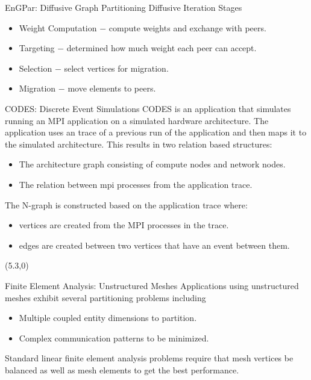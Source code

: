 \documentclass{beamer}
\begin{document}
\begin{textblock}{15.6}
\begin{textblock}{5}
\begin{block}{EnGPar: Diffusive Graph Partitioning}
      Diffusive Iteration Stages
      \begin{itemize}
      \item Weight Computation $-$ compute weights and exchange with peers.
      \item Targeting $-$ determined how much weight each peer can accept.
      \item Selection $-$ select vertices for migration.
      \item Migration $-$ move elements to peers.
      \end{itemize}
    \end{block}
    \begin{block}{CODES: Discrete Event Simulations}
      CODES is an application that simulates running an MPI application on a simulated hardware architecture. The application uses an trace of a previous run of the application and then maps it to the simulated architecture. This results in two relation based structures:
      \begin{itemize}
      \item The architecture graph consisting of compute nodes and network nodes.
      \item The relation between mpi processes from the application trace.
      \end{itemize}
      The N-graph is constructed based on the application trace where:
      \begin{itemize}
        \item vertices are created from the MPI processes in the trace.
        \item edges are created between two vertices that have an event between them.
      \end{itemize}
    \end{block}
  \end{textblock}
  \begin{textblock}{5}(5.3,0)
    \begin{block}{Finite Element Analysis: Unstructured Meshes}
      Applications using unstructured meshes exhibit several partitioning problems including
      \begin{itemize}
      \item Multiple coupled entity dimensions to partition.
      \item Complex communication patterns to be minimized.
      \end{itemize}
      Standard linear finite element analysis problems require that mesh vertices be balanced as well as mesh elements to get the best performance.\\

\end{block}
\end{textblock}
\end{textblock}
\end{document}
